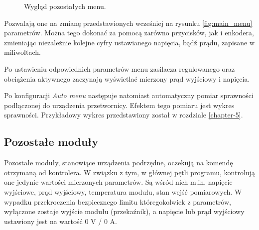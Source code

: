 \begin{figure}[h!]%
    \centering
    \qquad
    \caption{Wygląd pozostałych menu.}
    \label{fig:zdjecia_menu_auto}%
\end{figure}

Pozwalają one na zmianę przedstawionych wcześniej na rysunku \ref{fig:main_menu} parametrów. Można tego dokonać za pomocą 
zarówno przycisków, jak i enkodera, zmieniając niezależnie kolejne cyfry ustawianego napięcia, bądź prądu, zapisane w miliwoltach.

Po ustawieniu odpowiednich parametrów menu zasilacza regulowanego oraz obciążenia aktywnego zaczynają wyświetlać 
mierzony prąd wyjściowy i napięcia. 

Po konfiguracji \textit{Auto menu} następuje natomiast automatyczny pomiar sprawności podłączonej do urządzenia przetwornicy.
Efektem tego pomiaru jest wykres sprawności. Przykładowy wykres przedstawiony został w rozdziale \ref{chapter-5}.



\FloatBarrier
\subsection{Pozostałe moduły}

Pozostałe moduły, stanowiące urządzenia podrzędne, oczekują na komendę otrzymaną od kontrolera. W związku z tym, 
w głównej pętli programu, kontrolują one jedynie wartości mierzonych parametrów. Są wśród nich m.in. napięcie wyjściowe, 
prąd wyjściowy, temperatura modułu, stan wejść pomiarowych. W wypadku przekroczenia bezpiecznego limitu któregokolwiek z 
parametrów, wyłączone zostaje wyjście modułu (przekaźnik), a napięcie lub prąd wyjściowy ustawiony jest na wartość 0 V / 0 A.

